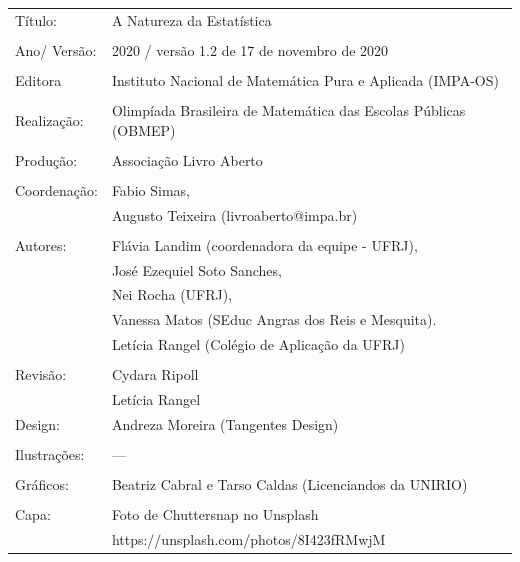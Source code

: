 \begin{tabular}{p{}p{}}
Título: & A Natureza da Estatística\\
\\
Ano/ Versão: & 2020 / versão 1.2 de 17 de novembro de 2020\\
\\
Editora & Instituto Nacional de Matem\'atica Pura e Aplicada (IMPA-OS)\\
\\
Realização:& Olimp\'iada Brasileira de Matem\'atica das Escolas P\'ublicas (OBMEP)\\
\\
Produção:& Associação Livro Aberto\\
\\
Coordenação: & Fabio Simas, \\
             & Augusto Teixeira (livroaberto@impa.br)\\
\\
  Autores: & Flávia Landim (coordenadora da equipe - UFRJ),\\
        & José Ezequiel Soto Sanches,\\
        & Nei Rocha (UFRJ),\\
             & Vanessa Matos (SEduc Angras dos Reis e Mesquita).\\
             & Letícia Rangel (Colégio de Aplicação da UFRJ)\\
\\
Revisão: &  Cydara Ripoll  \\
		 &  Letícia Rangel
\\
Design: & Andreza Moreira (Tangentes Design) \\
\\
  Ilustrações: & --- \\ 
\\
Gráficos: & Beatriz Cabral e Tarso Caldas (Licenciandos da UNIRIO)\\
\\
  Capa: & Foto de Chuttersnap no Unsplash \\
        & https://unsplash.com/photos/8I423fRMwjM \\

\end{tabular}



